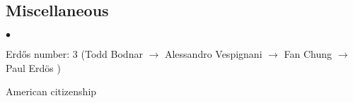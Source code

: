 \documentclass[margin,line]{res}
\newenvironment{list2}{
  \begin{list}{$\bullet$}{%
      \setlength{\itemsep}{0in}
      \setlength{\parsep}{0in} \setlength{\parskip}{0in}
      \setlength{\topsep}{0in} \setlength{\partopsep}{0in} 
      \setlength{\leftmargin}{10pt}}}{\end{list}}
\begin{document}
\begin{resume}
\section{\sc Miscellaneous}
\begin{list2}
\item Erd\H{o}s number: 3 (Todd Bodnar \(\rightarrow\) Alessandro Vespignani \(\rightarrow\) Fan Chung \(\rightarrow\) Paul Erd\"os )
\item American citizenship
\end{list2}


\end{resume}
\end{document}
